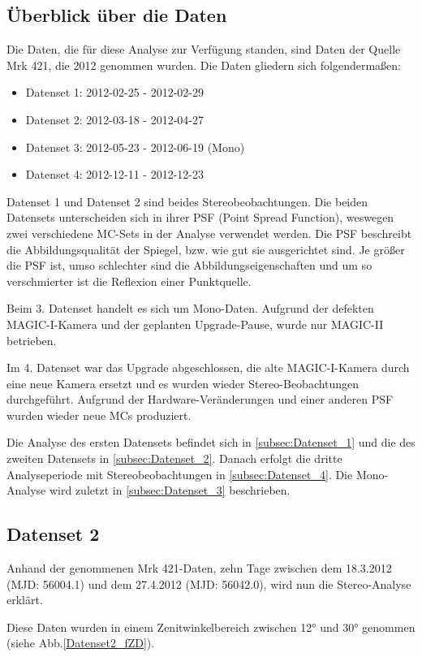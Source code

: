 \subsection{Überblick über die Daten}
Die Daten, die für diese Analyse zur Verfügung standen, sind Daten der Quelle Mrk 421, die 2012 genommen wurden.
Die Daten gliedern sich folgendermaßen:

\begin{itemize}
 \item Datenset 1: 2012-02-25 - 2012-02-29
 \item Datenset 2: 2012-03-18 - 2012-04-27
 \item Datenset 3: 2012-05-23 - 2012-06-19 (Mono)
 \item Datenset 4: 2012-12-11 - 2012-12-23
\end{itemize}

Datenset 1 und Datenset 2 sind beides Stereobeobachtungen.
Die beiden Datensets unterscheiden sich in ihrer PSF (Point Spread Function), weswegen zwei verschiedene MC-Sets in der Analyse verwendet werden.
Die PSF beschreibt die Abbildungsqualität der Spiegel, bzw. wie gut sie ausgerichtet sind.
Je größer die PSF ist, umso schlechter sind die Abbildungseigenschaften und um so verschmierter ist die Reflexion einer Punktquelle.

Beim 3. Datenset handelt es sich um Mono-Daten. 
Aufgrund der defekten MAGIC-I-Kamera und der geplanten Upgrade-Pause, wurde nur MAGIC-II betrieben.

Im 4. Datenset war das Upgrade abgeschlossen, die alte MAGIC-I-Kamera durch eine neue Kamera ersetzt und es wurden wieder Stereo-Beobachtungen durchgeführt.
Aufgrund der Hardware-Veränderungen und einer anderen PSF wurden wieder neue MCs produziert.

Die Analyse des ersten Datensets befindet sich in \autoref{subsec:Datenset_1} und die des zweiten Datensets in \autoref{subsec:Datenset_2}.
Danach erfolgt die dritte Analyseperiode mit Stereobeobachtungen in \autoref{subsec:Datenset_4}.
Die Mono-Analyse wird zuletzt in \autoref{subsec:Datenset_3} beschrieben.


\subsection{Datenset 2}
\label{subsec:Datenset_2}
Anhand der genommenen Mrk 421-Daten, zehn Tage zwischen dem 18.3.2012 (MJD: 56004.1) und dem 27.4.2012 (MJD: 56042.0), wird nun die Stereo-Analyse erklärt.

Diese Daten wurden in einem Zenitwinkelbereich zwischen 12° und 30° genommen (siehe Abb.\ref{Datenset2_fZD}).

